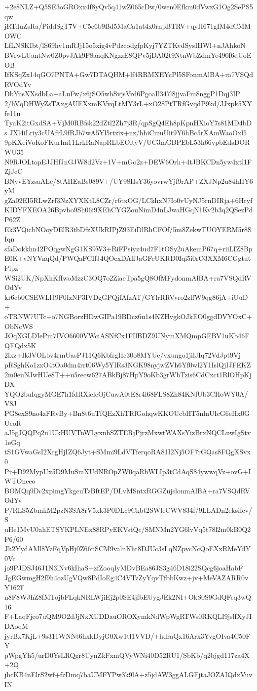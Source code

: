 +2e8NLZ+Q5SE3oGROxx4f8yQv5q41wZ065cDw/0wen0Efkm0dVwzG1Og2SePS5qw
jRTduZsRa/PiddSgT7V+C5c6b9Bd5MaCa1at4x0rnpBTRV+qyH671gIM4dCMMOWC
LfLNSKIbt/lS69hv1mRJj15o5xig4vPdzcodgfpKyj7YZTKvdSysIHWl+nJAhkoN
BVrwLUantNw0Z0pvJAk9F8aaqKNgzzE8QPv5jDA02t9NtnWbZdmYe490f6qUoEOB
IfKSqZx14qGO7PNTA+Gw7DTAQHM+lf4RRMXEYcPl5SFonmAlBA+ra7VSQdRVOdYv
DbYnsXXsdbLa+aLuFw/x6jSO5wbSvjsVrd6PgoaIl347l8jjvaFm8nggP1Dqj3IP
2/hVqDHWyZsTAxgAUEXxmKVvqLtMY3rL+xO28PtTRfGvqdP9kd/JJxpk5XYfe11u
TyaK2itGxdSA+VjM0RBfsk22dZtl2Zh7j3R/qpSgQ4Eh8pKpnHXioY7s81MD4bDs
JXl4iLriy3cUAfrL9fRJb7wA5Yl5rtzix+nz/hhiCmuUit9Y6hBc5rXAmWaoOxl5
9pKXeiVoKoFKurhn11LrkRaNapRLbEOltyV/UC3mGBPEbL53h66vpbEdsDORWU35
N9RJOLtopEJJHfJnGJW8d2Vz+1V+mGo2z+DEW6Orh+4tJBKCDn5yw4xtl1FZjJcC
BNyvEYzsaALc/8tAHEaBs089V+/UY98HsY36yovrwYjf9rAP+ZXJNp2u84hHY6yM
gZa02EI5RLwZrf3NzXYXKtL8CZr/r6txOG/LCkhxN7Io0vUyNJ5rnDIRja+6Hryf
KIDYFXEOA26Bpvbo9Sh06i9XEhCYGZouNimD4nLJwaHGqN1Kv2b3q2QSezPdP62Z
Ek3VQicbNOoyDElR3tbDfzXUkRIPjZ93EiDlRhCFOf/5m8ZekwTUOYERM5r8SIqn
sfaDokkhn42POqgwNgG1KS9W3+RiFPsiyz4ud7F1tOSy2uAkemP67q+riiLIZ8Bp
E0K+vNYVnqQd/PWQaFCIfJ4QOexDAlfJaGFcUKRD0Iqi5i0rO3XXM6CGgtutPlpz
WSi2UK/NpXhKfIwoMzzC3OQ7o2ZiaeTpa5gQ8OfMFydonmAlBA+ra7VSQdRVOdYv
kr6cb0CSEWLlJ9F0IzNP3IVDgGPQjfAfzAT/GYlrRRVvro2zffW9qg86jA+iUuD+
oTRNW7UTc+o7NGBorzHDwGIPa19BDcz6u1s4KZHvgkOJkEO0ggdDVYOxC+ObNcWS
JOqXGLDIePm7IVO6600VWciASNfCx1FIlBDZ9UNymXMQmpGEBV1uKb46FQEQdx5K
2lxz+Ik3VOLbv4rmUasPJ11Q6KbfrgHc30o8MYUe/vxungo1jilJIq72VdJpt9Vj
pRSghKo1zxO4tOa0dm4rrt06Wy5YIRs3NGK98nyjwZVh6Yf0wl2Y1IslQjIJFEKZ
2m0euNJwHUe8T++u5recw627ABkBj87HpY9oKb3grWbTzis6CdCxct1RlOHpKjDX
YQO2buIqgyMGE7h1fdRXielcOjCuwA0tE8r4l68FLS8Zh84KNfUb3CHoWY0A/V8J
PG8exS9no4zFRvBy+Bn8t6uTfQEzXhTRfGohqwKKOUcbHT5nlnUIcG6eHx0GUcoR
aJ5gJQQPq2u1UkHUVTnWLyxnhSZTERjPjrzMxwtWAXsYizBrxNQCLnwIgStv1eGq
tS1GVwaGsI2XrgHjIZQ6Jyt+SMmi9LdVTferqoRA81I2Nj5OF7rGQas8FQgXSvx0
Pr+D92MypUx5D9MuSmXUdNROpZW0qaRbWLIp3tCdAqS84ywwqVz+ovG+IWTOneeo
BOMQq9Dc2xpimgYkgcuTzBftEP/DLvMSntxRGGZujslonmAlBA+ra7VSQdRVOdYv
P/RLS5ZbmkM2pzN3SA8rV5xk3P0DLc9Ckbt2SWleCWV834f/9LLADn2eksifcv/S
uHe1MvU0ahETSYKPLNEx88RPyEKVstQc/SMNMn2YG6lvVq5t78l2m0kB0Q2P6/60
Jh2YydAMl8YzFqVpHj0Z66nSCM9valnKht8DJUc3sLqNZpvcNcQoEXxRMeYdY0Vc
jo9PJDSJ46J1N3lNv6kIhaS+zfZooqIyMDvBEa86JS3g46D18i22SQcg6joaHabF
JgEGwmgH2f9h4ozUgVQw8PdIoEg4C4VTzZyYqvTfbbKwz+jv+MeVAZARR0vY162F
n8F8WJhZ8fMTojbFLqkNRLWjiEj2p0SE4jfbEUygJEk2NI+OkS0S9GdQFcq3wQ16
F+LaqFjeo7uQM9O2dJjNxXUDDauOROXymkNdWpWgRTWs0RKQLI9jslfXyJIDAoqM
jyrBx7KjL+9s311WNNt6hxkDyjG0Xw1tl1VVD/+hdraQx16Arx3YvgOIva4C50FY
pWpgYh5/urD0YsLRQgr8UynZkFxmQVyWNi40D52RU1/SbKb/q2bjgd117za4X+2Q
jhcKB4nElrS2wf+fzDmq7baUMFYPw3k9lA+z5jdAW3ggALGFjtaJOZAIQdxVuvIN
